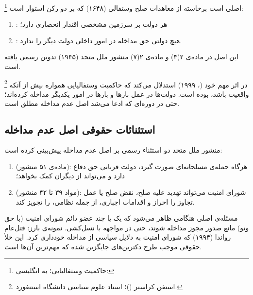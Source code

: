 \begin{tcolorbox}[defbox,
	title={مفهوم: حاکمیت وستفالیایی}]
	\footnote{حاکمیت وستفالیایی؛ به انگلیسی:
		}%
	اصلی است برخاسته از معاهدات صلح وستفالی (۱۶۴۸) که بر
	دو رکن استوار است:
	\begin{enumerate}[label=\textbf{\alph*.}, nosep, rightmargin=1em]
		\item {}: هر دولت بر سرزمین مشخصی
		اقتدار انحصاری دارد؛
		\item {}: هیچ دولتی حق مداخله در امور
		داخلی دولت دیگر را ندارد.
	\end{enumerate}
	این اصل در ماده‌ی ۲(۴) و ماده‌ی ۲(۷) منشور ملل متحد (۱۹۴۵)
	تدوین رسمی یافته
	است.
\end{tcolorbox}

%
\footnote{%
	استفن کراسنر ()؛%
	استاد علوم سیاسی دانشگاه استنفورد.%
}%
در اثر مهم خود
(، ۱۹۹۹)
استدلال می‌کند که حاکمیت وستفالیایی همواره بیش از آنکه واقعیت
باشد،  بوده
است.
دولت‌ها در عمل بارها و بارها در امور یکدیگر مداخله کرده‌اند؛
حتی در دوره‌ای که ادعا می‌شد اصل عدم مداخله مطلق است.

\subsection{استثنائات حقوقی اصل عدم مداخله}
\label{subsec:ch03-exceptions}

منشور ملل متحد دو استثناء رسمی بر اصل عدم مداخله پیش‌بینی
کرده است:

\begin{enumerate}[label=\textbf{\arabic*.}, nosep, rightmargin=1em]
	\item {}
	(ماده‌ی ۵۱ منشور): هرگاه
	حمله‌ی مسلحانه‌ای صورت گیرد، دولت قربانی حق دفاع دارد
	و می‌تواند از دیگران کمک بخواهد؛
	\item {}
	(مواد ۳۹ تا ۴۲ منشور): شورای
	امنیت می‌تواند تهدید علیه صلح، نقض صلح یا عمل تجاوز را
	احراز و اقدامات اجباری، از جمله نظامی، را تجویز کند.
\end{enumerate}

\begin{tcolorbox}[legalbox,
	title={خلأ حقوقی: مداخله بدون مجوز شورای امنیت}]
	مسئله‌ی اصلی هنگامی ظاهر می‌شود که یک یا چند عضو دائم شورای
	امنیت (با حق وتو) مانع صدور مجوز مداخله شوند، حتی در مواجهه
	با نسل‌کشی. نمونه‌ی بارز: قتل‌عام رواندا (۱۹۹۴) که شورای امنیت
	به دلایل سیاسی از مداخله خودداری
	کرد.
	این خلأ حقوقی موجب طرح دکترین‌های جایگزین شده که مهم‌ترین آن‌ها
	 است.
\end{tcolorbox}


